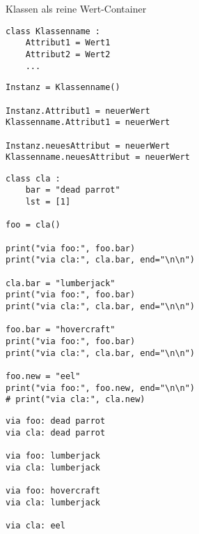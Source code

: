 \begin{frame}[fragile]{Klassen als reine Wert-Container}
%
\begin{codebox}
\begin{verbatim}
class Klassenname :
    Attribut1 = Wert1
    Attribut2 = Wert2
    ...
\end{verbatim}
\end{codebox}
%
\begin{codebox}
\begin{verbatim}
Instanz = Klassenname()

Instanz.Attribut1 = neuerWert
Klassenname.Attribut1 = neuerWert

Instanz.neuesAttribut = neuerWert
Klassenname.neuesAttribut = neuerWert
\end{verbatim}
\end{codebox}
%
\end{frame}


\begin{frame}[fragile]
%
\begin{tcbraster}[raster columns=2,
                  raster equal height,
                  nobeforeafter,
                  raster column skip=0.5cm]
\begin{codebox}
\begin{verbatim}
class cla :
    bar = "dead parrot"
    lst = [1]

foo = cla()

print("via foo:", foo.bar)
print("via cla:", cla.bar, end="\n\n")

cla.bar = "lumberjack"
print("via foo:", foo.bar)
print("via cla:", cla.bar, end="\n\n")

foo.bar = "hovercraft"
print("via foo:", foo.bar)
print("via cla:", cla.bar, end="\n\n")

foo.new = "eel"
print("via foo:", foo.new, end="\n\n")
# print("via cla:", cla.new)
\end{verbatim}
\end{codebox}
%
\begin{cmdbox}
\begin{verbatim}
via foo: dead parrot
via cla: dead parrot

via foo: lumberjack
via cla: lumberjack

via foo: hovercraft
via cla: lumberjack

via cla: eel
\end{verbatim}
\end{cmdbox}
\end{tcbraster}
%
\end{frame}

